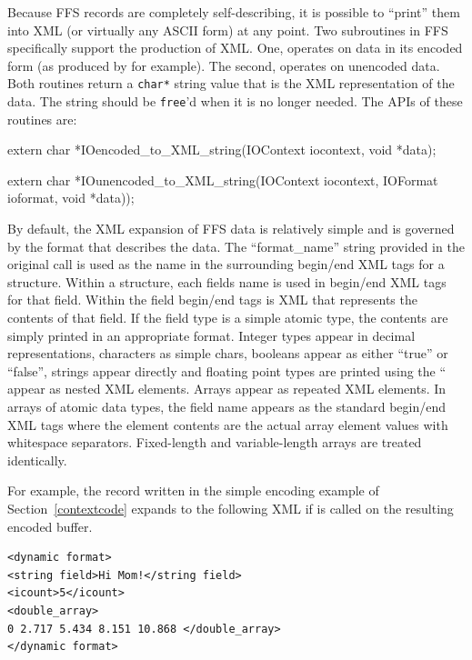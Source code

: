 Because FFS records are completely self-describing, it is possible to
``print'' them into XML (or virtually any ASCII form) at any point.  Two
subroutines in FFS specifically support the production of XML.  One,
 operates on data in its encoded form
(as produced by  for example).  The
second,  operates on unencoded data.
Both routines return a {\tt char*} string value that is the XML
representation of the data.  The string should be {\tt free}'d when it is no
longer needed.  The APIs of these routines are:
\begin{WrapCode}
extern char *IOencoded_to_XML_string(IOContext iocontext, void *data);

extern char *IOunencoded_to_XML_string(IOContext iocontext, IOFormat ioformat, void *data));
\end{WrapCode}
By default, the XML expansion of FFS data is relatively simple and is
governed by the format that describes the data.  The
``format\_name'' string provided in the original
 call is used as the name in the
surrounding begin/end XML tags for a structure.  Within a structure, each
fields name is used in begin/end XML tags for that field.  Within the field
begin/end tags is XML that represents the contents of that field.  If the
field type is a simple atomic type, the contents are simply printed in an
appropriate format.  Integer types appear in decimal representations,
characters as simple chars, booleans appear as either ``true'' or ``false'',
strings appear directly and floating point types are printed using the
``%
appear as nested XML elements.  Arrays appear as repeated XML elements.  In
arrays of atomic data types, the field name appears as the standard
begin/end XML tags where the element contents are the actual array element
values with whitespace separators.  Fixed-length and variable-length arrays
are treated identically.

For example, the record written in the simple encoding example of
Section~\ref{contextcode} expands to the following XML if
 is called on the resulting encoded
buffer. 
\begin{verbatim}
<dynamic format>
<string field>Hi Mom!</string field>
<icount>5</icount>
<double_array>
0 2.717 5.434 8.151 10.868 </double_array>
</dynamic format>
\end{verbatim}

